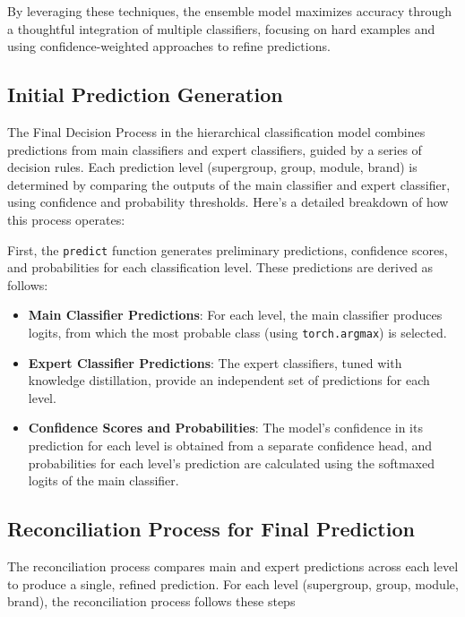 \documentclass[9pt,a4paper,twoside]{rho-class/rho}
\begin{document}
By leveraging these techniques, the ensemble model maximizes accuracy through a thoughtful integration of multiple classifiers, focusing on hard examples and using confidence-weighted approaches to refine predictions.

 \subsection{Initial Prediction Generation}
    
      The Final Decision Process in the hierarchical classification model combines predictions from main classifiers and expert classifiers, guided by a series of decision rules. Each prediction level (supergroup, group, module, brand) is determined by comparing the outputs of the main classifier and expert classifier, using confidence and probability thresholds. Here’s a detailed breakdown of how this process operates:

First, the \verb|predict| function generates preliminary predictions, confidence scores, and probabilities for each classification level. These predictions are derived as follows:

\begin{itemize}
    \item \textbf{Main Classifier Predictions}: For each level, the main classifier produces logits, from which the most probable class (using \verb|torch.argmax|) is selected.
    \item \textbf{Expert Classifier Predictions}: The expert classifiers, tuned with knowledge distillation, provide an independent set of predictions for each level.
    \item \textbf{Confidence Scores and Probabilities}: The model’s confidence in its prediction for each level is obtained from a separate confidence head, and probabilities for each level’s prediction are calculated using the softmaxed logits of the main classifier.
\end{itemize}


 \subsection{Reconciliation Process for Final Prediction}

 The reconciliation process compares main and expert predictions across each level to produce a single, refined prediction. For each level (supergroup, group, module, brand), the reconciliation process follows these steps
\end{document}
